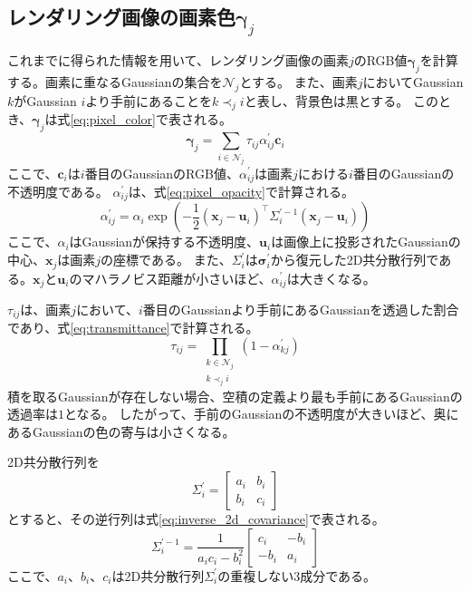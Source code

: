 \documentclass[dvipdfmx]{jlreq}
\begin{document}
\subsection{レンダリング画像の画素色$\bm{\gamma}_j$}
これまでに得られた情報を用いて、レンダリング画像の画素$j$のRGB値$\bm{\gamma}_j$を計算する。画素に重なるGaussianの集合を$\mathcal{N}_j$とする。
また、画素$j$においてGaussian $k$がGaussian $i$より手前にあることを$k\prec_j i$と表し、背景色は黒とする。
このとき、$\bm{\gamma}_j$は式\eqref{eq:pixel_color}で表される。
\begin{equation}
    \bm{\gamma}_j = \sum_{i\in\mathcal{N}_j}\tau_{ij}\alpha_{ij}^{\prime}\bm{c}_i
    \label{eq:pixel_color}
\end{equation}
ここで、$\bm{c}_i$は$i$番目のGaussianのRGB値、$\alpha_{ij}^{\prime}$は画素$j$における$i$番目のGaussianの不透明度である。
$\alpha_{ij}^{\prime}$は、式\eqref{eq:pixel_opacity}で計算される。
\begin{equation}
    \alpha_{ij}^{\prime} = \alpha_i \exp\left(-\frac{1}{2}(\bm{x}_j-\bm{u}_i)^{\top}\Sigma_i^{\prime-1}(\bm{x}_j-\bm{u}_i)\right)
    \label{eq:pixel_opacity}
\end{equation}
ここで、$\alpha_i$はGaussianが保持する不透明度、$\bm{u}_i$は画像上に投影されたGaussianの中心、$\bm{x}_j$は画素$j$の座標である。
また、$\Sigma_i^{\prime}$は$\bm{\sigma}_i^{\prime}$から復元した2D共分散行列である。$\bm{x}_j$と$\bm{u}_i$のマハラノビス距離が小さいほど、$\alpha_{ij}^{\prime}$は大きくなる。

$\tau_{ij}$は、画素$j$において、$i$番目のGaussianより手前にあるGaussianを透過した割合であり、式\eqref{eq:transmittance}で計算される。
\begin{equation}
    \tau_{ij} = \prod_{\substack{k\in\mathcal{N}_j\\k\prec_j i}} \left(1-\alpha_{kj}^{\prime}\right)
    \label{eq:transmittance}
\end{equation}
積を取るGaussianが存在しない場合、空積の定義より最も手前にあるGaussianの透過率は$1$となる。
したがって、手前のGaussianの不透明度が大きいほど、奥にあるGaussianの色の寄与は小さくなる。

2D共分散行列を
\begin{equation}
    \Sigma_i^{\prime} = \begin{bmatrix} a_i & b_i \\ b_i & c_i \end{bmatrix}
    \label{eq:covariance_2d_components}
\end{equation}
とすると、その逆行列は式\eqref{eq:inverse_2d_covariance}で表される。
\begin{equation}
    \Sigma_i^{\prime-1} = \frac{1}{a_i c_i-b_i^2} \begin{bmatrix} c_i & -b_i \\ -b_i & a_i \end{bmatrix}
    \label{eq:inverse_2d_covariance}
\end{equation}
ここで、$a_i$、$b_i$、$c_i$は2D共分散行列$\Sigma_i^{\prime}$の重複しない3成分である。
\end{document}
